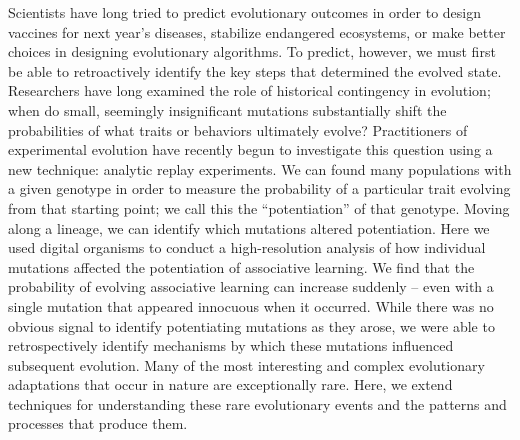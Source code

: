 
Scientists have long tried to predict evolutionary outcomes in order to design vaccines for next year's diseases, stabilize endangered ecosystems, or make better choices in designing evolutionary algorithms.
To predict, however, we must first be able to retroactively identify the key steps that determined the evolved state.
Researchers have long examined the role of historical contingency in evolution; when do small, seemingly insignificant mutations substantially shift the probabilities of what traits or behaviors ultimately evolve?
Practitioners of experimental evolution have recently begun to investigate this question using a new technique: analytic replay experiments.
We can found many populations with a given genotype in order to measure the probability of a particular trait evolving from that starting point; we call this the ``potentiation'' of that genotype. 
Moving along a lineage, we can identify which mutations altered potentiation.
Here we used digital organisms to conduct a high-resolution analysis of how individual mutations affected the potentiation of associative learning. %
We find that the probability of evolving associative learning can increase suddenly -- even with a single mutation that appeared innocuous when it occurred. 
While there was no obvious signal to identify potentiating mutations as they arose, we were able to retrospectively identify mechanisms by which these mutations influenced subsequent evolution.
Many of the most interesting and complex evolutionary adaptations that occur in nature are exceptionally rare.
Here, we extend techniques for understanding these rare evolutionary events and the patterns and processes that produce them.




